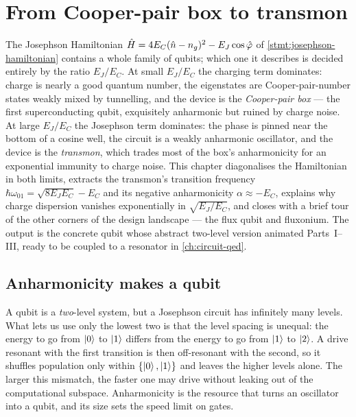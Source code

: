 \chapter{From Cooper-pair box to transmon}
\label{ch:transmon}

The Josephson Hamiltonian
$\hat{H}=4E_C(\hat{n}-n_g)^2-E_J\cos\hat{\varphi}$ of
\cref{stmt:josephson-hamiltonian} contains a whole family of qubits;
which one it describes is decided entirely by the ratio $E_J/E_C$. At
small $E_J/E_C$ the charging term dominates: charge is nearly a good
quantum number, the eigenstates are Cooper-pair-number states weakly
mixed by tunnelling, and the device is the \emph{Cooper-pair box} ---
the first superconducting qubit, exquisitely anharmonic but ruined by
charge noise. At large $E_J/E_C$ the Josephson term dominates: the
phase is pinned near the bottom of a cosine well, the circuit is a
weakly anharmonic oscillator, and the device is the \emph{transmon},
which trades most of the box's anharmonicity for an exponential
immunity to charge noise. This chapter diagonalises the Hamiltonian in
both limits, extracts the transmon's transition frequency
$\hbar\omega_{01}=\sqrt{8E_JE_C}-E_C$ and its negative anharmonicity
$\alpha\approx-E_C$, explains why charge dispersion vanishes
exponentially in $\sqrt{E_J/E_C}$, and closes with a brief tour of the
other corners of the design landscape --- the flux qubit and
fluxonium. The output is the concrete qubit whose abstract
two-level version animated Parts~I--III, ready to be coupled to a
resonator in \cref{ch:circuit-qed}.

\section{Anharmonicity makes a qubit}
\label{sec:anharmonicity}

\begin{phenomenon}
A qubit is a \emph{two}-level system, but a Josephson circuit has
infinitely many levels. What lets us use only the lowest two is that
the level spacing is unequal: the energy to go from $\ket0$ to $\ket1$
differs from the energy to go from $\ket1$ to $\ket2$. A drive resonant
with the first transition is then off-resonant with the second, so it
shuffles population only within $\{\ket0,\ket1\}$ and leaves the higher
levels alone. The larger this mismatch, the faster one may drive
without leaking out of the computational subspace. Anharmonicity is the
resource that turns an oscillator into a qubit, and its size sets the
speed limit on gates.
\end{phenomenon}

